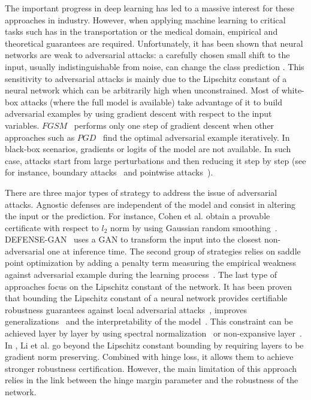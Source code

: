 The important progress in deep learning has led to a massive interest for these approaches in industry. However, when applying machine learning to critical tasks such has in the transportation or the medical domain, empirical and theoretical guarantees are required. Unfortunately, it has been shown that neural networks are weak to adversarial attacks: a carefully chosen small shift to the input, usually indistinguishable from noise, can change the class prediction \cite{szegedy2013}.  This sensitivity to adversarial attacks is mainly due to the Lipschitz constant of a neural network which can be arbitrarily high when unconstrained. Most of white-box attacks (where the full model is available) take advantage of it to build adversarial examples by using gradient descent with respect to the input variables. $FGSM$~\cite{Goodfellow2014a} performs only one step of gradient descent when other approaches such as $PGD$~\cite{Madry2017,carlini2017towards} find the optimal adversarial example iteratively. In black-box scenarios, gradients or logits of the model are not available. In such case, attacks start from large perturbations and then reducing it step by step (see for instance, boundary attacks~\cite{Brendel2018} and pointwise attacks~\cite{Schott2018}).

There are three major types of strategy to address the issue of adversarial attacks. Agnostic defenses are independent of the model and consist in altering the input or the prediction. For instance, Cohen et al. obtain a provable certificate with respect to $l_2$ norm by using Gaussian random smoothing~\cite{pmlr-v97-cohen19c}. DEFENSE-GAN~\cite{samangouei2018defensegan} uses a GAN to transform the input into the closest non-adversarial one at inference time. The second group of strategies relies on saddle point optimization by adding a penalty term measuring the empirical weakness against adversarial example during the learning process~\cite{Madry2017}. The last type of approaches focus on the Lipschitz constant of the network. It has been proven that bounding the  Lipschitz constant of a neural network provides certifiable robustness guarantees against local adversarial attacks~\cite{hein_formal_2017,ono_lightweight_2018}, improves generalizations~\cite{Sokolic_2017} and the interpretability of the model~\cite{tsipras2018robustness}.  This constraint can be achieved layer by layer by using spectral normalization~\cite{cisse_parseval_2017} or non-expansive layer~\cite{qian_l2-nonexpansive_2019}. In \cite{li2019preventing}, Li et al. go beyond the Lipschitz constant bounding by requiring layers to be gradient norm preserving. Combined with hinge loss, it allows them to achieve stronger robustness certification. However, the main limitation of this approach relies in the link between the hinge margin parameter and the robustness of the network.

